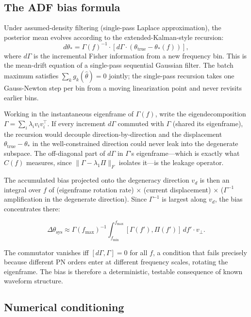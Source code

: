 \documentclass[twocolumn,prd,showpacs,superscriptaddress]{revtex4-2}
\newcommand{\fmin}{f_{\text{min}}}
\newcommand{\fmax}{f_{\text{max}}}
\newcommand{\vd}{v_{d}}          %
\begin{document}
\subsection{The ADF bias formula}
\label{sec:app_adf}

Under assumed-density filtering (single-pass Laplace approximation), the posterior mean evolves according to the extended-Kalman-style recursion:
\begin{equation}
d\theta_* = \Gamma(f)^{-1} \cdot [d\Gamma \cdot (\theta_{\text{true}} - \theta_*(f))],
\label{eq:app_shift}
\end{equation}
where $d\Gamma$ is the incremental Fisher information from a new frequency bin. This is the mean-drift equation of a single-pass sequential Gaussian filter. The batch maximum satisfies $\sum_k g_k(\hat\theta) = 0$ jointly; the single-pass recursion takes one Gauss-Newton step per bin from a moving linearization point and never revisits earlier bins.

Working in the instantaneous eigenframe of $\Gamma(f)$, write the eigendecomposition $\Gamma = \sum_i \lambda_i v_i v_i^\top$. If every increment $d\Gamma$ commuted with $\Gamma$ (shared its eigenframe), the recursion would decouple direction-by-direction and the displacement $\theta_{\text{true}} - \theta_*$ in the well-constrained direction could never leak into the degenerate subspace. The off-diagonal part of $d\Gamma$ in $\Gamma$'s eigenframe---which is exactly what $C(f)$ measures, since $\|\Gamma - \lambda_1 \Pi\|_F$ isolates it---is the leakage operator.

The accumulated bias projected onto the degeneracy direction $\vd$ is then an integral over $f$ of (eigenframe rotation rate) $\times$ (current displacement) $\times$ ($\Gamma^{-1}$ amplification in the degenerate direction). Since $\Gamma^{-1}$ is largest along $\vd$, the bias concentrates there:

\begin{equation}
\Delta\theta_{\text{sys}} \approx \Gamma(f_{\max})^{-1} \int_{\fmin}^{\fmax} [\Gamma(f'), \Pi(f')]\,df' \cdot v_\perp .
\label{eq:app_offset}
\end{equation}

The commutator vanishes iff $[d\Gamma, \Gamma] = 0$ for all $f$, a condition that fails precisely because different PN orders enter at different frequency scales, rotating the eigenframe. The bias is therefore a deterministic, testable consequence of known waveform structure.

\subsection{Numerical conditioning}
\end{document}
